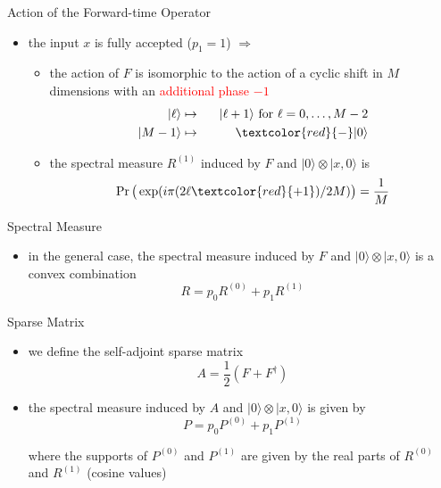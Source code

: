 \documentclass[slideColor]{prosper}
\renewcommand{\>}{\rangle}
\newcommand{\<}{\langle}
\begin{document}


\begin{slide}{Action of the Forward-time Operator}

\begin{itemize}
\item the input $x$ is fully accepted ($p_1=1$) $\Rightarrow$

\medskip
\begin{itemize}
\item the action of $F$ is isomorphic to the action of a cyclic shift in $M$ dimensions with an \textcolor{red}{additional phase $-1$}
\begin{eqnarray*}
|\ell\> & \mapsto & \phantom{-}|\ell + 1\> \mbox{ for $\ell=0,\ldots,M-2$} \\
|M-1\>  & \mapsto & \textcolor{red}{-} |0\>
\end{eqnarray*}

\medskip
\item the spectral measure $R^{(1)}$ induced by $F$ and $|0\>\otimes|x,0\>$ is 
\[
\Pr\big(\exp(i\pi (2\ell \textcolor{red}{+ 1}) / 2M)\big) = \frac{1}{M} 
\]

\end{itemize}
\end{itemize}

\end{slide}


\begin{slide}{Spectral Measure}

\begin{itemize}
\item in the general case, the spectral measure induced by $F$ and $|0\>\otimes |x,0\>$ is a convex
combination
\[
R = p_0 R^{(0)} + p_1 R^{(1)}
\]
\end{itemize}

\end{slide}


\begin{slide}{Sparse Matrix}

\begin{itemize}
\item we define the self-adjoint sparse matrix
\[
A = \frac{1}{2} (F + F^\dagger)
\]

\medskip
\item
the spectral measure induced by $A$ and $|0\>\otimes |x,0\>$ is given by
\[
P = p_0 P^{(0)} + p_1 P^{(1)}
\]

\medskip
where the supports of $P^{(0)}$ and $P^{(1)}$ are given by the real parts of $R^{(0)}$ and $R^{(1)}$ (cosine values)
\end{itemize}
\end{slide}
\end{document}
